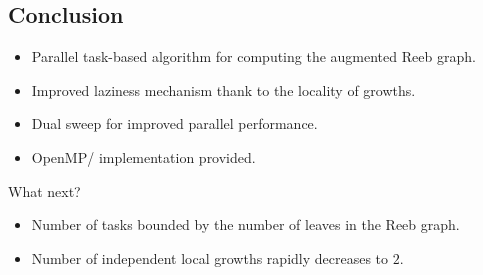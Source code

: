 \documentclass[10pt]{beamer}
\begin{document}
\subsection*{Conclusion}
\begin{frame*}
\begin{itemize}
\item Parallel task-based algorithm for computing the augmented Reeb graph.
\item Improved laziness mechanism thank to the locality of growths.
\item Dual sweep for improved parallel performance.
\item OpenMP/\cpluspluslogo{} implementation provided.
\end{itemize}
\begin{block}{What next?}
\begin{itemize}
\item Number of tasks bounded by the number of leaves in the Reeb graph.
\item Number of independent local growths rapidly decreases to $2$.
\end{itemize}
\end{block}
\end{frame*}
\end{document}
